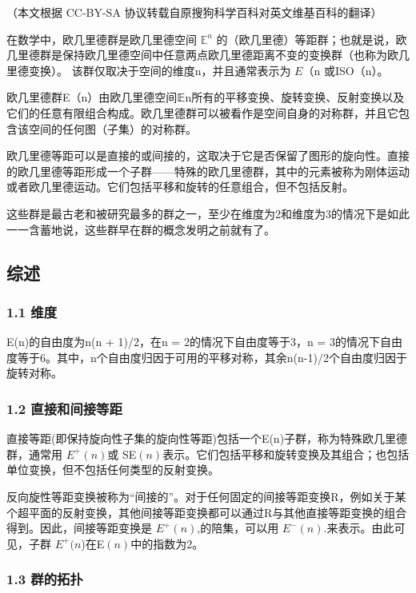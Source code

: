 
（本文根据 CC-BY-SA 协议转载自原搜狗科学百科对英文维基百科的翻译）

在数学中，欧几里德群是欧几里德空间 $\mathbb E^n$ 的（欧几里德）等距群；也就是说，欧几里德群是保持欧几里德空间中任意两点欧几里德距离不变的变换群（也称为欧几里德变换）。 该群仅取决于空间的维度n，并且通常表示为 $E$（n 或ISO（n）。

欧几里德群E（n）由欧几里德空间𝔼n所有的平移变换、旋转变换、反射变换以及它们的任意有限组合构成。欧几里德群可以被看作是空间自身的对称群，并且它包含该空间的任何图（子集）的对称群。

欧几里德等距可以是直接的或间接的，这取决于它是否保留了图形的旋向性。直接的欧几里德等距形成一个子群——特殊的欧几里德群，其中的元素被称为刚体运动或者欧几里德运动。它们包括平移和旋转的任意组合，但不包括反射。

这些群是最古老和被研究最多的群之一，至少在维度为2和维度为3的情况下是如此一一含蓄地说，这些群早在群的概念发明之前就有了。

\subsection{综述}

\subsubsection{1.1 维度}

E(n)的自由度为n(n + 1)/2，在n = 2的情况下自由度等于3，n = 3的情况下自由度等于6。其中，n个自由度归因于可用的平移对称，其余n(n-1)/2个自由度归因于旋转对称。

\subsubsection{1.2 直接和间接等距}

直接等距(即保持旋向性子集的旋向性等距)包括一个E(n)子群，称为特殊欧几里德群，通常用 $E^+(n)$或 SE$(n)$表示。它们包括平移和旋转变换及其组合；也包括单位变换，但不包括任何类型的反射变换。

反向旋性等距变换被称为“间接的”。对于任何固定的间接等距变换R，例如关于某个超平面的反射变换，其他间接等距变换都可以通过R与其他直接等距变换的组合得到。因此，间接等距变换是 $E^+(n)$,的陪集，可以用 $E^-(n)$.来表示。由此可见，子群 $E^+(n$)在E$(n)$中的指数为2。

\subsubsection{1.3 群的拓扑}

